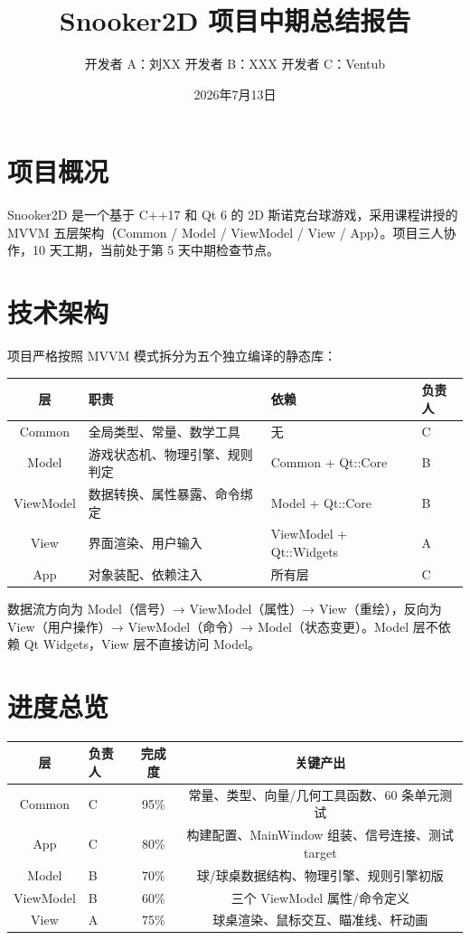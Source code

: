 \documentclass[11pt]{ctexart}
\title{Snooker2D 项目中期总结报告}
\author{开发者 A：刘XX \quad 开发者 B：XXX \quad 开发者 C：Ventub}
\date{2026年7月13日}
\begin{document}
\maketitle

\section{项目概况}

Snooker2D 是一个基于 C++17 和 Qt 6 的 2D 斯诺克台球游戏，采用课程讲授的 MVVM 五层架构（Common / Model / ViewModel / View / App）。项目三人协作，10 天工期，当前处于第 5 天中期检查节点。

\section{技术架构}

项目严格按照 MVVM 模式拆分为五个独立编译的静态库：

\begin{center}
\begin{tabular}{|c|l|l|l|}
\hline
\textbf{层} & \textbf{职责} & \textbf{依赖} & \textbf{负责人} \\
\hline
Common & 全局类型、常量、数学工具 & 无 & C \\
Model & 游戏状态机、物理引擎、规则判定 & Common + Qt::Core & B \\
ViewModel & 数据转换、属性暴露、命令绑定 & Model + Qt::Core & B \\
View & 界面渲染、用户输入 & ViewModel + Qt::Widgets & A \\
App & 对象装配、依赖注入 & 所有层 & C \\
\hline
\end{tabular}
\end{center}

数据流方向为 Model（信号）→ ViewModel（属性）→ View（重绘），反向为 View（用户操作）→ ViewModel（命令）→ Model（状态变更）。Model 层不依赖 Qt Widgets，View 层不直接访问 Model。

\section{进度总览}

\begin{center}
\begin{tabular}{|c|l|c|c|}
\hline
\textbf{层} & \textbf{负责人} & \textbf{完成度} & \textbf{关键产出} \\
\hline
Common & C & 95\% & 常量、类型、向量/几何工具函数、60 条单元测试 \\
App & C & 80\% & 构建配置、MainWindow 组装、信号连接、测试 target \\
Model & B & 70\% & 球/球桌数据结构、物理引擎、规则引擎初版 \\
ViewModel & B & 60\% & 三个 ViewModel 属性/命令定义 \\
View & A & 75\% & 球桌渲染、鼠标交互、瞄准线、杆动画 \\
\hline
\end{tabular}
\end{center}
\end{document}
